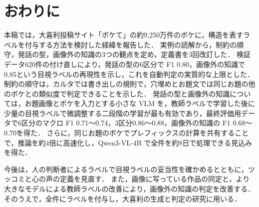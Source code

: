 \section{おわりに}
\label{sec_conclusion}
本稿では，大喜利投稿サイト「ボケて」の約9,250万件のボケに，構造を表すラベルを付与する方法を検討した経緯を報告した．
実例の読解から，制約の順守，発話の型，画像外の知識の3つの観点を定め，定義書を3回改訂した．
検証データ620件の付け直しにより，発話の型の6区分で F1 0.80，画像外の知識で0.85という目視ラベルの再現性を示し，これを自動判定の実質的な上限とした．
制約の順守は，カルタでは書き出しの規則で，穴埋めとお題文では同じお題の他のボケとの類似度で判定できることを示した．
発話の型と画像外の知識については，お題画像とボケを入力とする小さな VLM を，教師ラベルで学習した後に少量の目視ラベルで微調整する二段階の学習が最も有効であり，最終評価用データで6区分のマクロ F1 0.71〜0.74，3区分0.86〜0.88，画像外の知識の F1 0.68〜0.70を得た．
さらに，同じお題のボケでプレフィックスの計算を共有することで，推論を約4倍に高速化し，Qwen3-VL-4B で全件を約8日で処理できる見込みを得た．

今後は，人の判断者によるラベルで目視ラベルの妥当性を確かめるとともに，ツッコミと心の声の定義を見直す．
また，画像に写っている作品の同定と，より大きなモデルによる教師ラベルの改善により，画像外の知識の判定を改善する．
そのうえで，全件にラベルを付与し，大喜利の生成と判定の研究に用いる．
